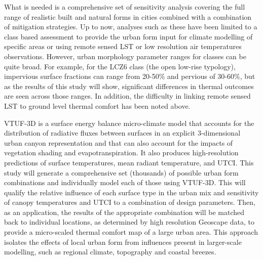 \documentclass[final,3p,times,authoryear]{elsarticle}
\begin{document}
What is needed is a comprehensive set of sensitivity analysis covering the full range of realistic built and natural forms in cities combined with a combination of mitigation strategies. Up to now, analyses such as these have been limited to a class based assessment to provide the urban form input for climate modelling of specific areas \citep{stewart2014eval,Verdonck2018,Hammerberg2018,Masson2020,Emery2021} or using remote sensed LST or low resolution air temperatures observations. However, urban morphology parameter ranges for classes can be quite broad. For example, for the LCZ6 class (the open low-rise typology), impervious surface fractions can range from 20-50\% and pervious of 30-60\%, but as the results of this study will show, significant differences in thermal outcomes are seen across those ranges. In addition, the difficulty in linking remote sensed LST to ground level thermal comfort has been noted above.

VTUF-3D is a surface energy balance micro-climate model that accounts for the distribution of radiative fluxes between surfaces in an explicit 3-dimensional urban canyon representation and that can also account for the impacts of vegetation shading and evapotranspiration. It also produces high-resolution predictions of surface temperatures, mean radiant temperature, and UTCI. This study will generate a comprehensive set (thousands) of possible urban form combinations and individually model each of those using VTUF-3D. This will qualify the relative influence of each surface type in the urban mix and sensitivity of canopy temperatures and UTCI to a combination of design parameters. Then, as an application, the results of the appropriate combination will be matched back to individual locations, as determined by high resolution Geoscape data, to provide a micro-scaled thermal comfort map of a large urban area. This approach isolates the effects of local urban form from influences present in larger-scale modelling, such as regional climate, topography and coastal breezes.
\end{document}
